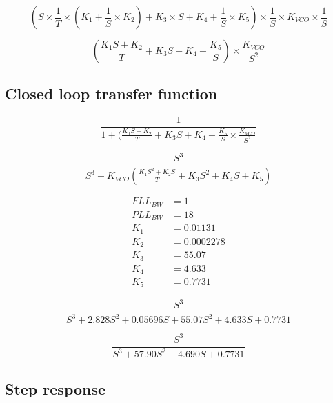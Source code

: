 \begin{equation}
(S \times \frac{1}{T} \times (K_1 + \frac{1}{S} \times K_2) + K_3 \times S + K_4 + \frac{1}{S} \times K_5) \times \frac{1}{S} \times K_{VCO} \times \frac{1}{S}
\end{equation}

\begin{equation}
(\frac{K_1 S + K_2}{T} + K_3  S + K_4 + \frac{K_5}{S} ) \times \frac{K_{VCO}}{S^2}
\end{equation}

\subsection{Closed loop transfer function}

\begin{comment}
PLL/FLL S^2 Ratio = 19.4
PLL/FLL S Ratio = 81.3339
\end{comment}

\begin{equation}
\frac{1}{1+(\frac{K_1 S + K_2}{T} + K_3  S +K_4  + \frac{K_5}{S}  \times \frac{K_{VCO}}{S^2}}
\end{equation}


\begin{equation}
\frac{S^3}{S^3 + K_{VCO}(\frac{K_1 S^2 + K_2 S}{T} + K_3 S^2 + K_4 S + K_5)}
\end{equation}

\begin{framed}
\begin{align*}
FLL_{BW}&=1\\
PLL_{BW}&=18\\
K_1 &=  0.01131\\
K_2 &=  0.0002278\\
K_3 &= 55.07\\
K_4 &= 4.633\\
K_5 &= 0.7731
\end{align*}
\end{framed}

\begin{equation}
\frac{S^3}{S^3 +2.828 S^2 + 0.05696 S + 55.07 S^2 + 4.633 S + 0.7731}
\end{equation}

\begin{equation}
\frac{S^3}{S^3 +57.90 S^2 + 4.690 S +0.7731}
\end{equation}

\subsection{Step response}

